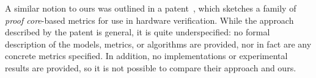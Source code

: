 
A similar notion to ours was outlined in a patent~\cite{hanna2015formal}, which sketches a family of {\em proof core}-based metrics for use in hardware verification.  While the approach described by the patent is general, it is quite underspecified:
no formal description of the models, metrics, or algorithms are provided, nor in fact are any concrete metrics specified. In addition, no implementations or experimental results are provided, so it is not possible to compare their approach and ours. 




